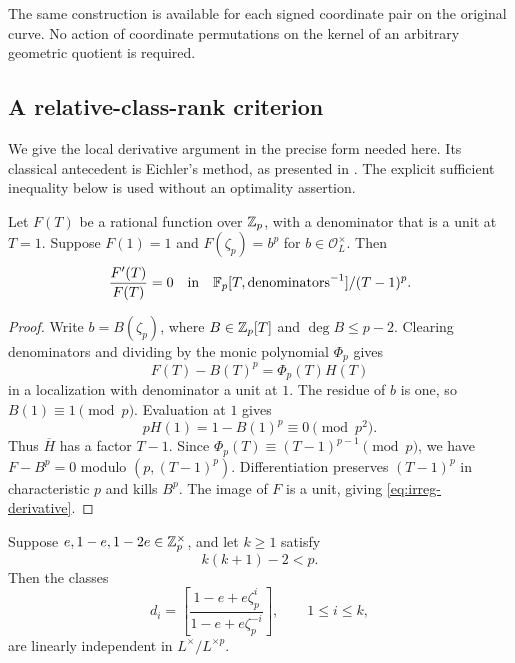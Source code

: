 The same construction is available for each signed coordinate pair
on the original curve. No action of coordinate permutations on the
kernel of an arbitrary geometric quotient is required.

\subsection{A relative-class-rank criterion}
\label{sec:irreg-rank}

We give the local derivative argument in the precise form needed
here. Its classical antecedent is Eichler's method, as presented in
\cite[Section 3.2, pp.~107--108]{Gras2010}. The explicit sufficient
inequality below is used without an optimality assertion.

\begin{lemma}\label{lem:irreg-derivative}
Let \(F(T)\) be a rational function over \(\mathbb Z_p\), with a denominator
that is a unit at \(T=1\). Suppose \(F(1)=1\) and
\(F(\zeta_p)=b^p\) for \(b\in\mathcal O_L^\times\). Then
\begin{equation}
 \frac{F'(T)}{F(T)}=0
 \quad\text{in}\quad
 \mathbb F_p[T,\text{denominators}^{-1}]/(T-1)^p.
 \label{eq:irreg-derivative}
\end{equation}
\end{lemma}

\begin{proof}
Write \(b=B(\zeta_p)\), where \(B\in\mathbb Z_p[T]\) and
\(\deg B\leq p-2\). Clearing denominators and dividing by the monic
polynomial \(\Phi_p\) gives
\[
 F(T)-B(T)^p=\Phi_p(T)H(T)
\]
in a localization with denominator a unit at \(1\).
The residue of \(b\) is one, so \(B(1)\equiv1\pmod p\). Evaluation at
\(1\) gives
\[
 pH(1)=1-B(1)^p\equiv0\pmod{p^2}.
\]
Thus \(\overline H\) has a factor \(T-1\). Since
\(\Phi_p(T)\equiv(T-1)^{p-1}\pmod p\), we have
\(F-B^p=0\) modulo \((p,(T-1)^p)\). Differentiation preserves
\((T-1)^p\) in characteristic \(p\) and kills \(B^p\). The image of
\(F\) is a unit, giving \eqref{eq:irreg-derivative}.
\end{proof}

\begin{lemma}\label{lem:irreg-k-independent}
Suppose \(e,1-e,1-2e\in\mathbb Z_p^\times\), and let \(k\geq1\) satisfy
\begin{equation}
 k(k+1)-2<p.
 \label{eq:irreg-k-bound}
\end{equation}
Then the classes
\[
 d_i=
 \left[\frac{1-e+e\zeta_p^i}{1-e+e\zeta_p^{-i}}\right],
 \qquad 1\leq i\leq k,
\]
are linearly independent in \(L^\times/L^{\times p}\).
\end{lemma}

